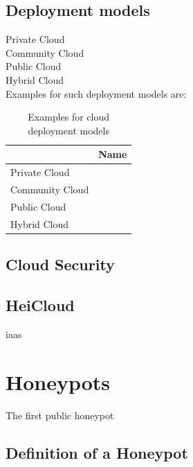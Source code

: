 \subsection{Deployment models}
\label{subsec:cloud-deployment}

Private Cloud\\

Community Cloud\\

Public Cloud\\

Hybrid Cloud\\

Examples for such deployment models are:
\begin{table}[h]
    \centering
    \caption{Examples for cloud deployment models}
    \begin{tabular}{|l|l|}
        \hline
                        & Name \\ \hline
        Private Cloud   &      \\ \hline
        Community Cloud &      \\ \hline
        Public Cloud    &      \\ \hline
        Hybrid Cloud    &      \\ \hline
    \end{tabular}
\end{table}

\subsection{Cloud Security}

\cite{Nithin2012}

\subsection{HeiCloud}

\ac{iaas}

\section{Honeypots}

The first public honeypot \cite{Spitzner2003}

\subsection{Definition of a Honeypot}

